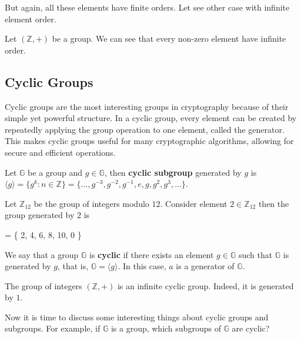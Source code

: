 \documentclass[../lecture-notes-148x210.tex]{subfiles}
\begin{document}
But again, all these elements have finite orders. Let see other case with infinite element order.

\begin{example}
    Let $(\mathbb{Z}, +)$ be a group. We can see that every non-zero element have infinite order.
\end{example}

\subsection{Cyclic Groups}

Cyclic groups are the most interesting groups in cryptography because of their simple yet 
powerful structure. In a cyclic group, every element can be created by repeatedly applying the 
group operation to one element, called the generator. This makes cyclic groups useful for many 
cryptographic algorithms, allowing for secure and efficient operations. 

\begin{definition}
    Let $\mathbb{G}$ be a group and $g \in \mathbb{G}$, then \textbf{cyclic subgroup} generated 
    by $g$ is $\langle g \rangle = \{g^k: n \in \mathbb{Z}\} = 
    \{\dots,g^{-3}, g^{-2}, g^{-1}, e, g, g^2, g^3, \dots\}$.
\end{definition}

\begin{example}
    Let $\mathbb{Z}_{12}$ be the group of integers modulo $12$. 
    Consider element $2 \in \mathbb{Z}_{12}$ then the group generated by $2$ is
    \begin{xequation}
         \rangle = \{ 2, 4, 6, 8, 10, 0 \}
    \end{xequation}
\end{example}

\begin{definition}
    We say that a group $\mathbb{G}$ is \textbf{cyclic} if there exists an element $g \in \mathbb{G}$ 
    such that $\mathbb{G}$ is generated by $g$, that is, $\mathbb{G} = \langle g \rangle$. 
    In this case, $a$ is a generator of $\mathbb{G}$.
\end{definition}

\begin{example}
    The group of integers $(\mathbb{Z},+)$ is an infinite cyclic group. Indeed, it is 
    generated by $1$.
\end{example}

Now it is time to discuss some interesting things about cyclic groups and subgroups.
For example, if $\mathbb{G}$ is a group, which subgroups of $\mathbb{G}$ are cyclic?
\end{document}
